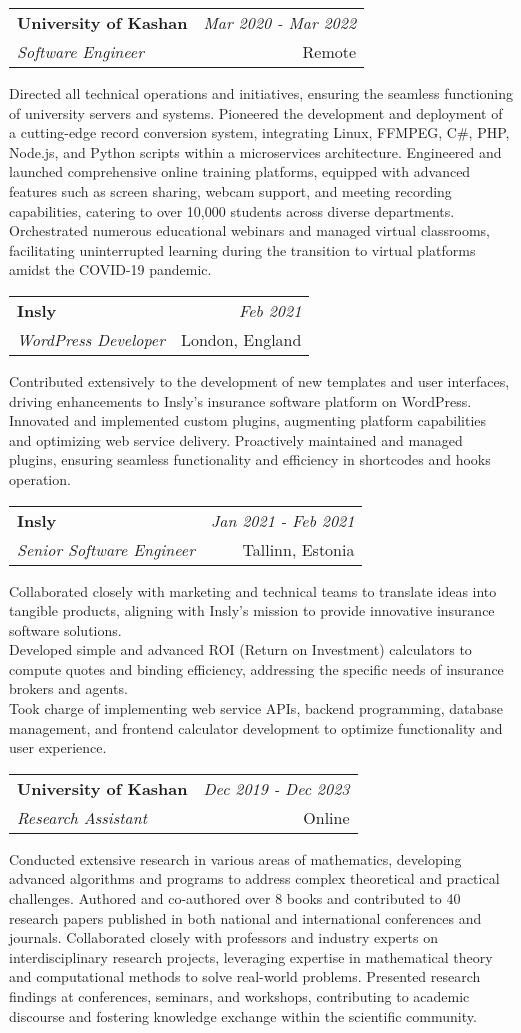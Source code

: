 \documentclass[a4paper,10pt]{article}
\makeatletter
\newcommand{\resumeSubheading}[4]{
	\vspace{0.5mm}\item
	\begin{tabular*}{0.98\textwidth}[t]{l@{\extracolsep{\fill}}r}
		\textbf{#1} & \textit{\footnotesize{#4}} \\
		\textit{\footnotesize{#3}} &  \footnotesize{#2}\\
	\end{tabular*}
	\vspace{-2.4mm}
}
\newcommand{\resumeItemListStart}{\begin{justify}\begin{itemize}[leftmargin=3ex, rightmargin=2ex, noitemsep,labelsep=1.2mm,itemsep=0mm]\small}
\newcommand{\resumeItemListEnd}{\end{itemize}\end{justify}\vspace{-2mm}}
\makeatother
\begin{document}
\vspace{-1mm}
\resumeSubheading
{University of Kashan}{Remote}
{Software Engineer}{Mar 2020 - Mar 2022}
\resumeItemListStart
Directed all technical operations and initiatives, ensuring the seamless functioning of university servers and systems. Pioneered the development and deployment of a cutting-edge record conversion system, integrating Linux, FFMPEG, C\#, PHP, Node.js, and Python scripts within a microservices architecture. Engineered and launched comprehensive online training platforms, equipped with advanced features such as screen sharing, webcam support, and meeting recording capabilities, catering to over 10,000 students across diverse departments. Orchestrated numerous educational webinars and managed virtual classrooms, facilitating uninterrupted learning during the transition to virtual platforms amidst the COVID-19 pandemic.
\resumeItemListEnd

\vspace{-1mm}
\resumeSubheading
{Insly}{London, England}
{WordPress Developer}{Feb 2021}
\resumeItemListStart
Contributed extensively to the development of new templates and user interfaces, driving enhancements to Insly's insurance software platform on WordPress. Innovated and implemented custom plugins, augmenting platform capabilities and optimizing web service delivery. Proactively maintained and managed plugins, ensuring seamless functionality and efficiency in shortcodes and hooks operation.
\resumeItemListEnd

\vspace{-1mm}
\resumeSubheading
{Insly}{Tallinn, Estonia}
{Senior Software Engineer}{Jan 2021 - Feb 2021}
\resumeItemListStart
Collaborated closely with marketing and technical teams to translate ideas into tangible products, aligning with Insly's mission to provide innovative insurance software solutions.\\
Developed simple and advanced ROI (Return on Investment) calculators to compute quotes and binding efficiency, addressing the specific needs of insurance brokers and agents.\\
Took charge of implementing web service APIs, backend programming, database management, and frontend calculator development to optimize functionality and user experience.
\resumeItemListEnd

\vspace{-1mm}
\resumeSubheading
{University of Kashan}{Online}
{Research Assistant}{Dec 2019 - Dec 2023}
\resumeItemListStart
Conducted extensive research in various areas of mathematics, developing advanced algorithms and programs to address complex theoretical and practical challenges. Authored and co-authored over 8 books and contributed to 40 research papers published in both national and international conferences and journals. Collaborated closely with professors and industry experts on interdisciplinary research projects, leveraging expertise in mathematical theory and computational methods to solve real-world problems. Presented research findings at conferences, seminars, and workshops, contributing to academic discourse and fostering knowledge exchange within the scientific community. 
\resumeItemListEnd
\end{document}
